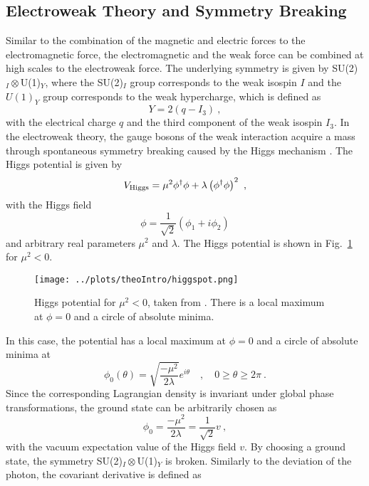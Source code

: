 \subsection{Electroweak Theory and Symmetry Breaking}
\label{subsec:theo:EWK}
Similar to the combination of the magnetic and electric forces to the electromagnetic force, the electromagnetic and the weak force can be combined at high scales to the electroweak force. The underlying symmetry is given by SU(2)$_I\otimes$U(1)$_Y$, where the SU(2)$_I$ group corresponds to the weak isospin $I$ and the $U(1)_Y$ group corresponds to the weak hypercharge, which is defined as
\begin{equation}
Y=2(q-I_3) ~,
\end{equation}
with the electrical charge $q$ and the third component of the weak isospin $I_3$. In the electroweak theory, the gauge bosons of the weak interaction acquire a mass through spontaneous symmetry breaking caused by the Higgs mechanism \cite{higgsmech}. The Higgs potential is given by
\begin{equation}
V_{\rm Higgs} = \mu^2 \phi^\dagger\phi + \lambda \left(\phi^\dagger\phi\right)^2 ~,
\end{equation}
with the Higgs field
\begin{equation}
\phi=\frac{1}{\sqrt{2}}(\phi_1+i\phi_2)
\end{equation}
and arbitrary real parameters $\mu^2$ and $\lambda$. The Higgs potential is shown in Fig.~\ref{fig:theo:higgspot} for $\mu^2<0$.
\begin{figure}
	\centering
	\texttt{[image: ../plots/theoIntro/higgspot.png]}
	\caption[Higgs potential for $\mu^2<0$]{Higgs potential for $\mu^2<0$, taken from \cite{higgspot}. There is a local maximum at $\phi=0$ and a circle of absolute minima.}
	\label{fig:theo:higgspot}
\end{figure}
In this case, the potential has a local maximum at $\phi=0$ and a circle of absolute minima at
\begin{equation}
\phi_0(\theta) = \sqrt{\frac{-\mu^2}{2\lambda}}e^{i\theta} \quad , \quad 0\geq \theta \geq 2\pi ~.
\end{equation}
Since the corresponding Lagrangian density is invariant under global phase transformations, the ground state can be arbitrarily chosen as
\begin{equation}
\phi_0 = \frac{-\mu^2}{2\lambda}=\frac{1}{\sqrt{2}}v ~, \label{eq:theo:higgsexp}
\end{equation}
with the vacuum expectation value of the Higgs field $v$. By choosing a ground state, the symmetry SU(2)$_I\otimes$U(1)$_Y$ is broken. Similarly to the deviation of the photon, the covariant derivative is defined as
